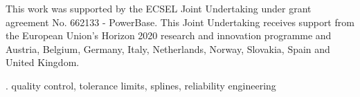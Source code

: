 \documentclass[12pt]{article}
\begin{document}
\vskip 2mm


This work was supported by the ECSEL Joint Undertaking under grant agreement No. 662133 - PowerBase. This Joint Undertaking receives support from the European Union's Horizon 2020 research and innovation programme and Austria, Belgium, Germany, Italy, Netherlands, Norway, Slovakia, Spain and United Kingdom.
\vskip 2mm

. quality control, tolerance limits, splines, reliability engineering


%        
%
%        
\end{document}
